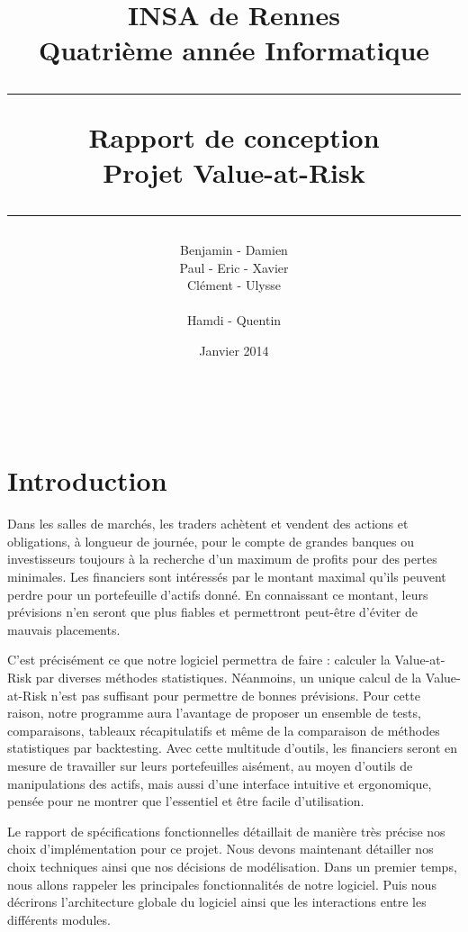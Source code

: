 \documentclass[a4paper]{report}
\title{INSA de Rennes \\ Quatrième année Informatique \\ \bigskip \hrule \bigskip Rapport de conception \\ \bigskip Projet Value-at-Risk \bigskip \hrule}
\author{Benjamin \bsc{Bouguet} - Damien \bsc{Carduner} \\Paul \bsc{Chaignon} - Eric \bsc{Chauty} - Xavier \bsc{Fraboulet} \\ Clément \bsc{Gautrais} - Ulysse \bsc{Goarant} \\ ~~\\
Hamdi \bsc{Raissi} - Quentin \bsc{Giai Gianetto}}
\date{Janvier 2014}
\begin{document}
\maketitle

\thispagestyle{empty}
\newpage

~~
\thispagestyle{empty}
\newpage


\tableofcontents
\newpage

\listoffigures
\newpage




\chapter*{Introduction}

Dans les salles de marchés, les traders achètent et vendent des actions et obligations, à longueur de journée, pour le compte de grandes banques ou investisseurs toujours à la recherche d’un maximum de profits pour des pertes minimales.
Les financiers sont intéressés par le montant maximal qu'ils peuvent perdre pour un portefeuille d'actifs donné.
En connaissant ce montant, leurs prévisions n’en seront que plus fiables et permettront peut-être d’éviter de mauvais placements.

C’est précisément ce que notre logiciel permettra de faire : calculer la Value-at-Risk par diverses méthodes statistiques.
Néanmoins, un unique calcul de la Value-at-Risk n’est pas suffisant pour permettre de bonnes prévisions.
Pour cette raison, notre programme aura l’avantage de proposer un ensemble de tests, comparaisons, tableaux récapitulatifs et même de la comparaison de méthodes statistiques par backtesting.
Avec cette multitude d’outils, les financiers seront en mesure de travailler sur leurs portefeuilles aisément, au moyen d’outils de manipulations des actifs, mais aussi d’une interface intuitive et ergonomique, pensée pour ne montrer que l’essentiel et être facile d’utilisation.

Le rapport de spécifications fonctionnelles détaillait de manière très précise nos choix d’implémentation pour ce projet.
Nous devons maintenant détailler nos choix techniques ainsi que nos décisions de modélisation.
Dans un premier temps, nous allons rappeler les principales fonctionnalités de notre logiciel.
Puis nous décrirons l’architecture globale du logiciel ainsi que les interactions entre les différents modules.
\end{document}
